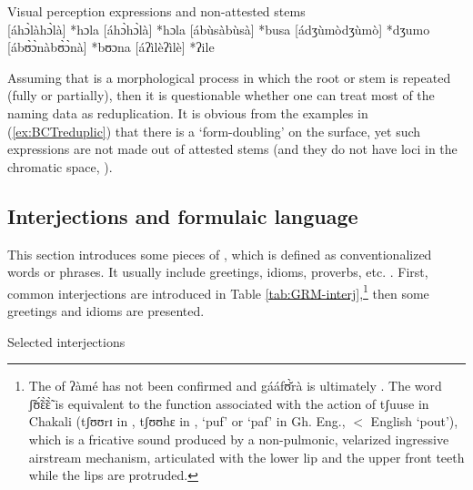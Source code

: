 \begin{exe}
\begin{exe}
\begin{exe}
\begin{exe}
\begin{exe}
\begin{exe}
\begin{exe}
\begin{exe}
\begin{exe}
\begin{exe}
\begin{exe}
\begin{exe}

\ea\label{ex:BCTreduplic}{\rm Visual perception expressions  and 
non-attested stems}\\

	  [áhɔ̀làhɔ̀là]   *hɔla   
		[áhɔ̀hɔ̀là] *hɔla   
	[ábùsàbùsà]	 *busa  
	[ádʒùmòdʒùmò] *dʒumo  
	[ábʊ̀ɔ̀nàbʊ̀ɔ̀nà]		 *bʊɔna  
	[áʔìlèʔìlè]	 *ʔile 

\z
\z


Assuming that  is a morphological process in which the root or 
stem is repeated (fully or partially), then it is questionable whether one can 
treat most of the naming data as reduplication. It is obvious from the examples in 
(\ref{ex:BCTreduplic}) that there is a `form-doubling' on the surface, yet such 
expressions  are not made out of attested stems (and they do not have loci in the chromatic space, 
\citealt[see][]{brin16}).  


\subsection{Interjections and formulaic language}
\label{sec:GRM-formulaic}

This section introduces some pieces of , which is defined as conventionalized words or phrases. It usually include greetings, idioms, proverbs,  etc. \citep{Wray05}. First, common interjections are introduced in Table \ref{tab:GRM-interj},\footnote{The  of {\sls ʔàmé} has not been confirmed and {\sls gááfʊ̆̀rà} is  ultimately . The word {\sls ʃ̃ʊ̃́ɛ̃̀ɛ̃̀} is equivalent to the function  associated with the action of {\sls tʃuuse} in Chakali ({\sls tʃʊʊrɪ} in , {\sls tʃʊʊhɛ} in , `puf' or `paf'  in Gh.  Eng.,   $<$ English `pout'), which is a fricative sound produced by a non-pulmonic, velarized ingressive airstream mechanism, articulated with the lower lip and the upper front teeth while the lips are protruded.} then some greetings and idioms are presented. 


\begin{table}[!htb]
\small
\centering
\caption{Selected interjections \label{tab:GRM-interj}}


\end{table}
\end{exe}
\end{exe}
\end{exe}
\end{exe}
\end{exe}
\end{exe}
\end{exe}
\end{exe}
\end{exe}
\end{exe}
\end{exe}
\end{exe}
